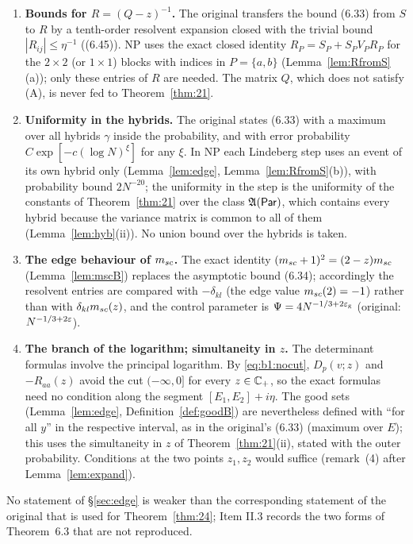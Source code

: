 \begin{enumerate}
\item[\textbf{II.6.}] \textbf{Bounds for $R=(Q-z)^{-1}$.} The original transfers the bound (6.33) from $S$ to $R$ by a tenth-order resolvent expansion closed with the trivial bound $|R_{ij}|\le\eta^{-1}$ ((6.45)). NP uses the exact closed
identity $R_P=S_P+S_PV_PR_P$ for the $2\times2$ (or $1\times1$) blocks with indices in $P=\{a,b\}$ (Lemma~\ref{lem:RfromS}(a)); only these entries of $R$ are needed. The matrix $Q$, which does not satisfy (A), is never fed to
Theorem~\ref{thm:21}.

\item[\textbf{II.7.}] \textbf{Uniformity in the hybrids.} The original states (6.33) with a maximum over all hybrids $\gamma$ inside the probability, and with error probability $C\exp[-c(\log N)^\xi]$ for any $\xi$. In NP each
Lindeberg step uses an event of its own hybrid only (Lemma~\ref{lem:edge}, Lemma~\ref{lem:RfromS}(b)), with probability bound $2N^{-20}$; the uniformity in the step is the uniformity of the constants of
Theorem~\ref{thm:21} over the class $\mathfrak{A}(\mathsf{Par})$, which contains every hybrid because the variance matrix is common to all of them (Lemma~\ref{lem:hyb}(ii)). No union bound over the hybrids is taken.

\item[\textbf{II.8.}] \textbf{The edge behaviour of $m_{sc}$.} The exact identity $(m_{sc}+1)^2=(2-z)m_{sc}$ (Lemma~\ref{lem:mscB}) replaces the asymptotic bound (6.34); accordingly the resolvent entries are compared with $-\delta_{kl}$
(the edge value $m_{sc}(2)=-1$) rather than with $\delta_{kl}m_{sc}(z)$, and the control parameter is $\Psi=4N^{-1/3+2\varepsilon_{\mathrm g}}$ (original: $N^{-1/3+2\varepsilon}$).

\item[\textbf{II.9.}] \textbf{The branch of the logarithm; simultaneity in $z$.} The determinant formulas involve the principal logarithm. By \eqref{eq:b1:nocut}, $D_p(v;z)$ and $-R_{aa}(z)$ avoid the cut $(-\infty,0]$ for
every $z\in\mathbb{C}_+$, so the exact formulas need no condition along the segment $[E_1,E_2]+i\eta$. The good sets (Lemma~\ref{lem:edge}, Definition~\ref{def:goodB}) are nevertheless defined with ``for all $y$'' in the respective
interval, as in the original's (6.33) (maximum over $E$); this uses the simultaneity in $z$ of Theorem~\ref{thm:21}(ii), stated with the outer probability. Conditions at the two points $z_1,z_2$ would suffice
(remark~(4) after Lemma~\ref{lem:expand}).
\end{enumerate}
\noindent No statement of \S\ref{sec:edge} is weaker than the corresponding statement of the original that is used for Theorem~\ref{thm:24}; Item II.3 records the two forms of Theorem~6.3 that are not reproduced.

